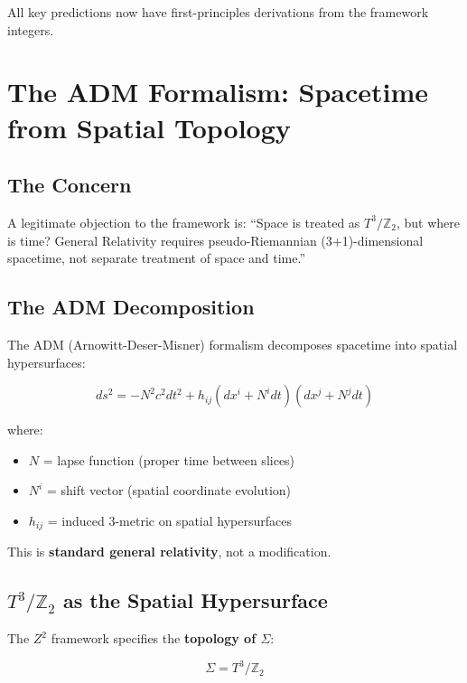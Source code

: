 \documentclass[12pt,a4paper]{article}
\newcommand{\Ztwo}{\mathbb{Z}_2}
\newcommand{\Tthree}{T^3}
\newcommand{\Zsq}{Z^2}
\begin{document}
All key predictions now have first-principles derivations from the framework integers.

\section{The ADM Formalism: Spacetime from Spatial Topology}
\label{sec:adm}

\subsection{The Concern}

A legitimate objection to the framework is: ``Space is treated as $\Tthree/\Ztwo$, but where is time? General Relativity requires pseudo-Riemannian (3+1)-dimensional spacetime, not separate treatment of space and time.''

\subsection{The ADM Decomposition}

The ADM (Arnowitt-Deser-Misner) formalism decomposes spacetime into spatial hypersurfaces:

\begin{equation}
ds^2 = -N^2 c^2 dt^2 + h_{ij}(dx^i + N^i dt)(dx^j + N^j dt)
\end{equation}

where:
\begin{itemize}
    \item $N$ = lapse function (proper time between slices)
    \item $N^i$ = shift vector (spatial coordinate evolution)
    \item $h_{ij}$ = induced 3-metric on spatial hypersurfaces
\end{itemize}

This is \textbf{standard general relativity}, not a modification.

\subsection{$\Tthree/\Ztwo$ as the Spatial Hypersurface}

The $\Zsq$ framework specifies the \textbf{topology of $\Sigma$}:

\begin{equation}
\Sigma = \Tthree/\Ztwo
\end{equation}
\end{document}
